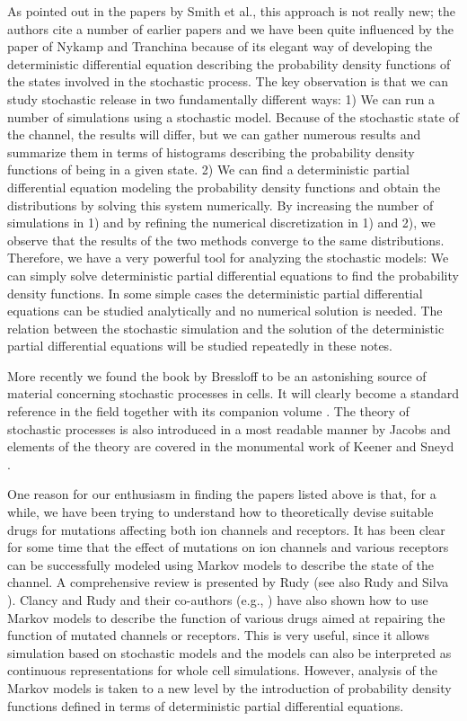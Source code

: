 As pointed out in the papers by Smith et al., this approach is not really new; the authors cite a number of earlier papers and we have been quite influenced by the paper of Nykamp and Tranchina \cite{Nykamp2000} because of its elegant way of developing the deterministic differential equation describing the probability density functions of the states involved in the stochastic process. 
The key observation is that we can study stochastic release in two fundamentally different ways: 1) We can run a number of simulations using a stochastic model. Because of the stochastic state of the channel, the results will differ, but we can gather numerous results and summarize them in terms of histograms describing the probability density functions of being in a given state. 2) We can find a deterministic partial differential equation modeling the probability density functions and obtain the distributions by solving this system numerically. By increasing the number of simulations in 1) and by refining the numerical discretization in 1) and 2), we observe that the results of the two methods converge to the same distributions. Therefore, we have a very powerful tool for analyzing the stochastic models: We can simply solve deterministic partial differential equations to find the probability density functions. In some simple cases the deterministic partial differential equations can be studied analytically and no numerical solution is needed.  The relation between the stochastic simulation and the solution 
of the deterministic partial differential equations will be studied repeatedly in these notes.


\bigskip
More recently we found the book by Bressloff \cite{Bressloff2014} to be an astonishing source of material concerning stochastic processes in cells. It will clearly become a standard reference in the field together with its companion volume \cite{Bressloff2014w}. The theory of stochastic processes is also introduced in a most readable manner by Jacobs \cite{Jacobs2010} and elements of the theory are covered in the monumental work of Keener and Sneyd \cite{Keener2010_I,Keener2010_II}.


\bigskip

One reason for our enthusiasm in finding the papers listed above is that, for a while, we have been trying to understand how to theoretically devise suitable drugs for mutations affecting both ion channels and receptors. It has been clear for some time that the effect of mutations on ion channels and various receptors can be successfully modeled using Markov models to describe the state of the channel. A comprehensive review is presented by Rudy \cite{Rudy2012} (see also Rudy and Silva \cite{Rudy2006}). Clancy and Rudy and their co-authors (e.g., \cite{Clancy2007}) have also shown how to use Markov models to describe the function of various drugs aimed at repairing the function of mutated channels or receptors. This is very useful, since it allows simulation based on stochastic models and the models can also be interpreted as continuous representations for whole cell simulations. However, analysis of the Markov models is taken to a new level by the introduction of probability density functions defined in terms of deterministic partial differential equations.

